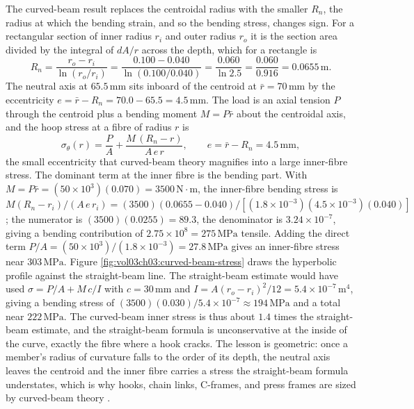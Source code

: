 The curved-beam result replaces the centroidal radius with the smaller
 $R_n$, the radius at which the bending
strain, and so the bending stress, changes sign. For a rectangular
section of inner radius $r_i$ and outer radius $r_o$ it is the section
area divided by the integral of $dA/r$ across the depth, which for a
rectangle is
\[
R_n = \frac{r_o - r_i}{\ln(r_o/r_i)} = \frac{0.100 - 0.040}{\ln(0.100/
0.040)} = \frac{0.060}{\ln 2.5} = \frac{0.060}{0.916} = 0.0655\,\si{
\meter}.
\]
The neutral axis at $65.5\,\si{\milli\meter}$ sits inboard of the
centroid at $\bar{r} = 70\,\si{\milli\meter}$ by the eccentricity
$e = \bar{r} - R_n = 70.0 - 65.5 = 4.5\,\si{\milli\meter}$. The load
is an axial tension $P$ through the centroid plus a bending moment $M =
P\bar{r}$ about the centroidal axis, and the hoop stress at a fibre of
radius $r$ is
\[
\sigma_\theta(r) = \frac{P}{A} + \frac{M\,(R_n - r)}{A\,e\,r}, \qquad
e = \bar{r} - R_n = 4.5\,\si{\milli\meter},
\]
the small eccentricity that curved-beam theory magnifies into a large
inner-fibre stress.
The dominant term at the inner fibre is the bending part. With $M =
P\bar{r} = (50\times 10^3)(0.070) = 3500\,\text{N}\cdot\text{m}$, the
inner-fibre bending stress is $M(R_n - r_i)/(A\,e\,r_i) = (3500)(0.0655 -
0.040)/[(1.8\times 10^{-3})(4.5\times 10^{-3})(0.040)]$; the numerator is
$(3500)(0.0255) = 89.3$, the denominator is $3.24\times 10^{-7}$, giving
a bending contribution of $2.75\times 10^8 = 275\,\text{MPa}$ tensile.
Adding the direct term $P/A = (50\times 10^3)/(1.8\times
10^{-3}) = 27.8\,\text{MPa}$ gives an inner-fibre stress near $303\,\text{
MPa}$. Figure \ref{fig:vol03ch03:curved-beam-stress} draws the hyperbolic
profile against the straight-beam line. The straight-beam estimate would
have used $\sigma = P/A + M\,c/I$ with $c = 30\,\si{\milli\meter}$ and $I
= A(r_o - r_i)^2/12 = 5.4\times 10^{-7}\,\si{\meter}^4$, giving a bending
stress of $(3500)(0.030)/5.4\times 10^{-7} \approx 194\,\text{MPa}$ and a
total near $222\,\text{MPa}$. The curved-beam inner stress is thus about
$1.4$ times the straight-beam estimate, and the straight-beam formula is
unconservative at the inside of the curve, exactly the fibre where a hook
cracks. The lesson is geometric: once a member's radius of curvature
falls to the order of its depth, the neutral axis leaves the centroid and
the inner fibre carries a stress the straight-beam formula understates,
which is why hooks, chain links, C-frames, and press frames are sized by
curved-beam theory \cite[ch.~9]{text:crandall-mech-of-solids}.

